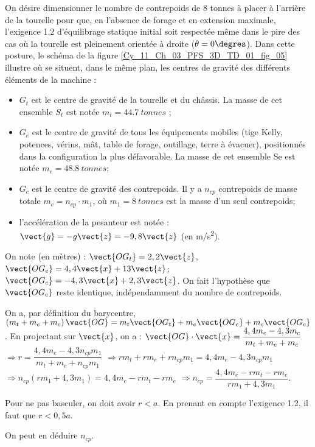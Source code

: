 \ifprof
\else
On désire dimensionner le nombre de contrepoids de 8 tonnes à 
placer à l’arrière de la tourelle pour que, en l’absence de forage 
et en extension maximale, l’exigence 1.2 d’équilibrage statique 
initial soit respectée même dans le pire des cas où la tourelle est 
pleinement orientée à droite ($\theta=0\degres$). Dans cette posture, le 
schéma de la figure \ref{Cy_11_Ch_03_PFS_3D_TD_01_fig_05} illustre où se situent, dans le même plan, 
les centres de gravité des différents éléments de la machine :  
\begin{itemize}
\item $G_t$ est le centre de gravité de la tourelle et du châssis. La 
masse de cet ensemble $S_t$ est notée $m_t = \SI{44,7}{tonnes}$ ; 
\item $G_e$ est le centre de gravité de tous les équipements mobiles 
(tige Kelly, potences, vérins, mât, table de forage, outillage, 
terre à évacuer), positionnés dans la configuration la plus 
défavorable. La masse de cet ensemble Se est notée 
$m_e = \SI{48,8}{tonnes}$; 
\item $G_c$ est le centre de gravité des contrepoids. Il y a $n_{cp}$ 
contrepoids de masse totale $m_c = n_{cp}\cdot m_1$, où $m_1 = \SI{8}{tonnes}$
est la masse d’un seul contrepoids; 
\item l’accélération de la pesanteur est notée : $\vect{g}=-g\vect{z}=-9,8\vect{z}$
(en \si{m/s^2}).
\end{itemize} 
On note (en mètres) : $\vect{OG_t}=2,2\vect{z}$, $\vect{OG_e}=4,4\vect{x}+13\vect{z}$; $\vect{OG_c}=-4,3\vect{x}+2,3\vect{z}$. On fait l'hypothèse que $\vect{OG_c}$ reste identique, indépendamment du nombre de contrepoids. 

\fi

\ifprof
\begin{corrige}
On a, par définition du barycentre, 
$\left( m_t + m_e +m_c \right) \vect{OG} = m_t \vect{OG_t} + m_e \vect{OG_e} + m_c \vect{OG_c} $.
En projectant sur $\vect{x}$, on a :  
$ \vect{OG}\cdot \vect{x} =   \dfrac{4,4 m_e  -4,3 m_c}{m_t + m_e +m_c }  $
$ \Rightarrow r =   \dfrac{4,4 m_e  -4,3 n_{cp}m_1}{m_t + m_e +n_{cp}m_1 }  $
$ \Rightarrow r m_t + rm_e +rn_{cp}m_1=   4,4 m_e  -4,3 n_{cp}m_1 $
$ \Rightarrow n_{cp}\left(r m_1 + 4,3 m_1\right) =   4,4 m_e  - r m_t - rm_e $
$ \Rightarrow n_{cp} =  \dfrac{ 4,4 m_e  - r m_t - rm_e}{r m_1 + 4,3 m_1} $.

Pour ne pas basculer, on doit avoir $r<a$. En prenant en compte l'exigence 1.2, il faut que $r<0,5a$.

On peut en déduire $n_{cp}$.
\end{corrige}
\else
\fi
